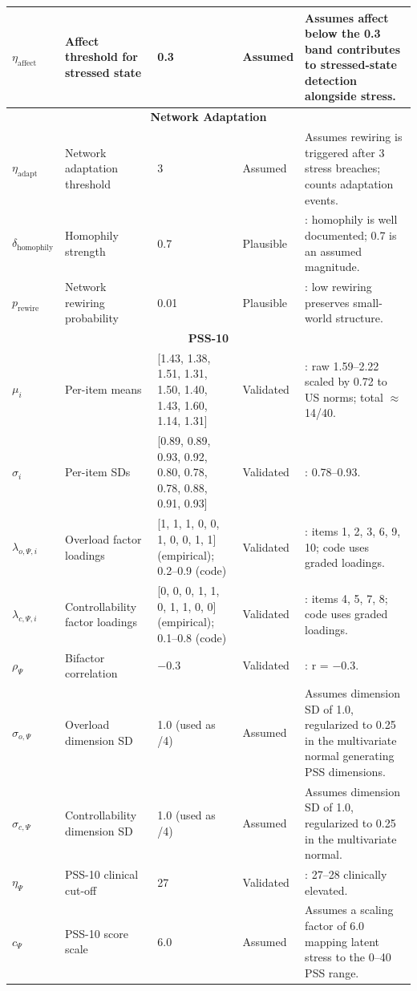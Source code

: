 \documentclass[
  letterpaper,
  DIV=11,
  numbers=noendperiod]{scrartcl}
\begin{document}
\begin{longtable}{lp{2.4cm}p{1.6cm}p{1.7cm}p{5.2cm}}
$\eta_{\mathrm{affect}}$ & Affect threshold for stressed state & 0.3 & Assumed & Assumes affect below the 0.3 band contributes to stressed-state detection alongside stress. \\
\midrule
\multicolumn{5}{c}{\textbf{Network Adaptation}} \\
\midrule
$\eta_{\mathrm{adapt}}$ & Network adaptation threshold & 3 & Assumed & Assumes rewiring is triggered after 3 stress breaches; counts adaptation events. \\
$\delta_{\mathrm{homophily}}$ & Homophily strength & 0.7 & Plausible & \cite{Boomgaard2018}: homophily is well documented; 0.7 is an assumed magnitude. \\
$p_{\mathrm{rewire}}$ & Network rewiring probability & 0.01 & Plausible & \cite{watts1998}: low rewiring preserves small-world structure. \\
\midrule
\multicolumn{5}{c}{\textbf{PSS-10}} \\
\midrule
$\mu_i$ & Per-item means & [1.43, 1.38, 1.51, 1.31, 1.50, 1.40, 1.43, 1.60, 1.14, 1.31] & Validated & \cite{liu2020}: raw 1.59--2.22 scaled by 0.72 to US norms; total $\approx$ 14/40. \\
$\sigma_i$ & Per-item SDs & [0.89, 0.89, 0.93, 0.92, 0.80, 0.78, 0.78, 0.88, 0.91, 0.93] & Validated & \cite{liu2020}: 0.78--0.93. \\
$\lambda_{o,\Psi,i}$ & Overload factor loadings & [1, 1, 1, 0, 0, 1, 0, 0, 1, 1] (empirical); 0.2--0.9 (code) & Validated & \cite{liu2020}: items 1, 2, 3, 6, 9, 10; code uses graded loadings. \\
$\lambda_{c,\Psi,i}$ & Controllability factor loadings & [0, 0, 0, 1, 1, 0, 1, 1, 0, 0] (empirical); 0.1--0.8 (code) & Validated & \cite{liu2020}: items 4, 5, 7, 8; code uses graded loadings. \\
$\rho_{\Psi}$ & Bifactor correlation & $-0.3$ & Validated & \cite{reis2017}: r = $-0.3$. \\
$\sigma_{o,\Psi}$ & Overload dimension SD & 1.0 (used as /4) & Assumed & Assumes dimension SD of 1.0, regularized to 0.25 in the multivariate normal generating PSS dimensions. \\
$\sigma_{c,\Psi}$ & Controllability dimension SD & 1.0 (used as /4) & Assumed & Assumes dimension SD of 1.0, regularized to 0.25 in the multivariate normal. \\
$\eta_{\Psi}$ & PSS-10 clinical cut-off & 27 & Validated & \cite{cohen1983}: 27--28 clinically elevated. \\
$c_{\Psi}$ & PSS-10 score scale & 6.0 & Assumed & Assumes a scaling factor of 6.0 mapping latent stress to the 0--40 PSS range. \\

\end{longtable}
\end{document}
